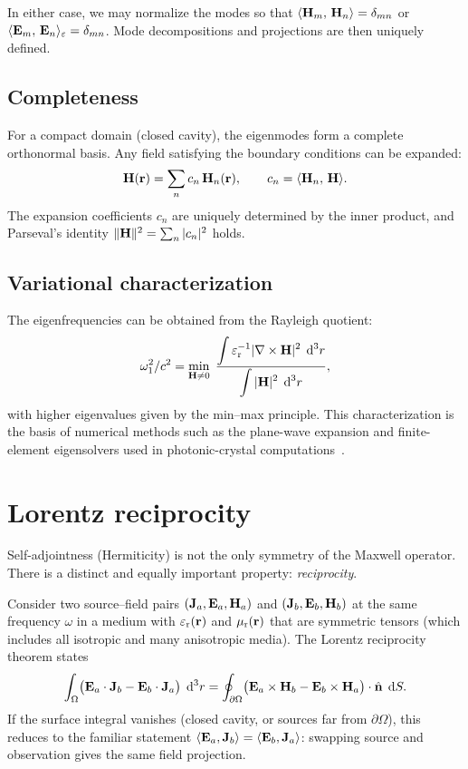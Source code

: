 In either case, we may normalize the modes so that
$\langle\mathbf{H}_m,\,\mathbf{H}_n\rangle = \delta_{mn}$ or
$\langle\mathbf{E}_m,\,\mathbf{E}_n\rangle_\varepsilon = \delta_{mn}$. Mode decompositions
and projections are then uniquely defined.

\subsection{Completeness}
\label{ssec:completeness}

For a compact domain (closed cavity), the eigenmodes form a complete
orthonormal basis. Any field satisfying the boundary conditions can be
expanded:
\begin{equation}
 \mathbf{H}(\mathbf{r}) = \sum_n c_n\,\mathbf{H}_n(\mathbf{r}),
 \qquad
 c_n = \langle\mathbf{H}_n,\,\mathbf{H}\rangle.
 \label{eq:completeness}
\end{equation}
The expansion coefficients $c_n$ are uniquely determined by the inner
product, and Parseval's identity
$\|\mathbf{H}\|^2 = \sum_n |c_n|^2$ holds.

\subsection{Variational characterization}
\label{ssec:variational}

The eigenfrequencies can be obtained from the Rayleigh quotient:
\begin{equation}
 \omega_1^2/c^2
 = \min_{\mathbf{H}\neq 0}\;
 \frac{\displaystyle\int\varepsilon_{\mathrm{r}}^{-1}|\nabla\times\mathbf{H}|^2\;\mathop{}\!\mathrm{d}^3 r}
 {\displaystyle\int|\mathbf{H}|^2\;\mathop{}\!\mathrm{d}^3 r},
 \label{eq:variational}
\end{equation}
with higher eigenvalues given by the min--max principle. This
characterization is the basis of numerical methods such as the plane-wave
expansion and finite-element eigensolvers used in photonic-crystal
computations~\cite{paz2019tutorial}.


\section{Lorentz reciprocity}
\label{sec:reciprocity}

Self-adjointness (Hermiticity) is not the only symmetry of the Maxwell
operator. There is a distinct and equally important property:
\emph{reciprocity}.

Consider two source--field pairs $(\mathbf{J}_a, \mathbf{E}_a, \mathbf{H}_a)$ and
$(\mathbf{J}_b, \mathbf{E}_b, \mathbf{H}_b)$ at the same frequency $\omega$ in a medium
with $\varepsilon_{\mathrm{r}}(\mathbf{r})$ and $\mu_{\mathrm{r}}(\mathbf{r})$ that are symmetric tensors (which
includes all isotropic and many anisotropic media). The Lorentz
reciprocity theorem states
\begin{equation}
 \int_\Omega\bigl(\mathbf{E}_a\cdot\mathbf{J}_b - \mathbf{E}_b\cdot\mathbf{J}_a\bigr)\;\mathop{}\!\mathrm{d}^3 r
 = \oint_{\partial\Omega}
 \bigl(\mathbf{E}_a\times\mathbf{H}_b - \mathbf{E}_b\times\mathbf{H}_a\bigr)\cdot\hat{\mathbf{n}}\;\mathop{}\!\mathrm{d} S.
 \label{eq:lorentz-reciprocity}
\end{equation}
If the surface integral vanishes (closed cavity, or sources far from
$\partial\Omega$), this reduces to the familiar statement
$\langle\mathbf{E}_a,\mathbf{J}_b\rangle = \langle\mathbf{E}_b,\mathbf{J}_a\rangle$:
swapping source and observation gives the same field projection.

